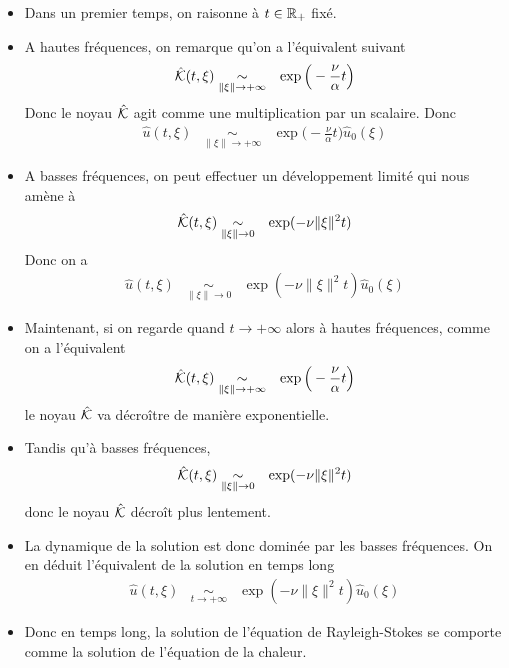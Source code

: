 \begin{frame}
\begin{itemize}
    \item Dans un premier temps, on raisonne à $t \in \mathbb{R}_+$ fixé.
    \item A hautes fréquences, on remarque qu'on a l'équivalent suivant
    \begin{eqnarray*}
        \hat{\mathcal{K}}(t,\xi) &\underset{\|\xi\|\to+\infty}{\sim}& \exp\Big(-\frac{\nu}{\alpha}t\Big)
    \end{eqnarray*}
    Donc le noyau $\hat{\mathcal{K}}$ agit comme une multiplication par un scalaire. Donc
    \begin{eqnarray*}
        \hat{u}(t,\xi) &\underset{\|\xi\|\to+\infty}{\sim}& \exp\Big(-\frac{\nu}{\alpha}t\Big)\hat{u}_0(\xi)
    \end{eqnarray*}
        \item A basses fréquences, on peut effectuer un développement limité qui nous amène à
    \begin{eqnarray*}
        \hat{\mathcal{K}}(t,\xi) &\underset{\|\xi\|\to 0}{\sim}& \exp(-\nu\|\xi\|^2t)
    \end{eqnarray*}
    Donc on a 
    \begin{eqnarray*}
        \hat{u}(t,\xi) &\underset{\|\xi\|\to 0}{\sim}& \exp(-\nu\|\xi\|^2t)\hat{u}_0(\xi)
    \end{eqnarray*}
\end{itemize}
\end{frame}

\begin{frame}
    \begin{itemize}
    \item Maintenant, si on regarde quand $t \to +\infty$ alors à hautes fréquences, comme on a l'équivalent
\begin{eqnarray*}
    \hat{\mathcal{K}}(t,\xi) &\underset{\|\xi\|\to+\infty}{\sim}& \exp\Big(-\frac{\nu}{\alpha}t\Big)
\end{eqnarray*}
le noyau $\hat{\mathcal{K}}$ va décroître de manière exponentielle. 
\item Tandis qu'à basses fréquences, 
\begin{eqnarray*}
    \hat{\mathcal{K}}(t,\xi) &\underset{\|\xi\|\to 0}{\sim}& \exp(-\nu\|\xi\|^2t)
\end{eqnarray*}
donc le noyau $\hat{\mathcal{K}}$ décroît plus lentement.
    \item La dynamique de la solution est donc dominée par les basses fréquences. On en déduit l'équivalent de la solution en temps long
\begin{eqnarray*}
    \hat{u}(t,\xi) &\underset{t \to +\infty}{\sim}& \exp(-\nu\|\xi\|^2t)\hat{u}_0(\xi)
\end{eqnarray*} 
\item Donc en temps long, la solution de l'équation de Rayleigh-Stokes se comporte comme la solution de l'équation de la chaleur.
\end{itemize}
\end{frame}